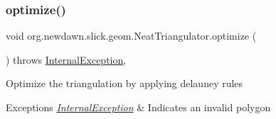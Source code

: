 \subsubsection{\texorpdfstring{optimize()}{optimize()}}
{\footnotesize\ttfamily void org.\+newdawn.\+slick.\+geom.\+Neat\+Triangulator.\+optimize (\begin{DoxyParamCaption}{ }\end{DoxyParamCaption}) throws \mbox{\hyperlink{classorg_1_1newdawn_1_1slick_1_1geom_1_1_neat_triangulator_1_1_internal_exception}{Internal\+Exception}}\hspace{0.3cm}{\ttfamily [inline]}, {\ttfamily [private]}}

Optimize the triangulation by applying delauney rules


\begin{DoxyExceptions}{Exceptions}
{\em \mbox{\hyperlink{classorg_1_1newdawn_1_1slick_1_1geom_1_1_neat_triangulator_1_1_internal_exception}{Internal\+Exception}}} & Indicates an invalid polygon \\
\hline
\end{DoxyExceptions}

